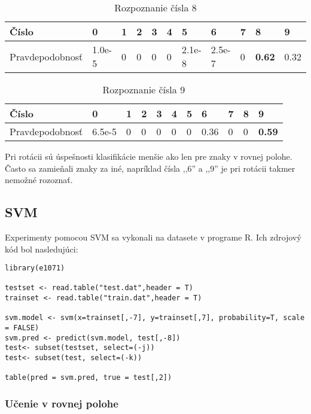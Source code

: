 \begin{table}[H]
  \begin{tabular}{ | l | l | l | l | l | l | l | l | l | l | l |}
    \hline
    Číslo & 0 & 1 & 2 & 3 & 4 & 5 & 6 & 7 & 8 & 9 \\ \hline
    Pravdepodobnosť & 1.0e-5 & 0 & 0 & 0 & 0 & 2.1e-8 & 2.5e-7 & 0 & \textbf{0.62} & 0.32 \\
    \hline
  \end{tabular}
  \caption[Rozpoznanie čísla 8]{Rozpoznanie čísla 8}
\end{table}

\begin{table}[H]
  \begin{tabular}{ | l | l | l | l | l | l | l | l | l | l | l |}
    \hline
    Číslo & 0 & 1 & 2 & 3 & 4 & 5 & 6 & 7 & 8 & 9 \\ \hline
    Pravdepodobnosť & 6.5e-5 & 0 & 0 & 0 & 0 & 0 & 0.36 & 0 & 0 & \textbf{0.59} \\
    \hline
  \end{tabular}
  \caption[Rozpoznanie čísla 9]{Rozpoznanie čísla 9}
\end{table}

Pri rotácii sú úspešnosti klasifikácie menšie ako len pre znaky v rovnej polohe. Často sa zamieňali znaky za iné, napríklad čísla ,,6'' a ,,9'' je pri rotácii takmer nemožné rozoznať.


\newpage
\subsection{SVM} %

Experimenty pomocou SVM sa vykonali na datasete v programe R. Ich zdrojový kód bol nasledujúci:

\begin{verbatim}
library(e1071)
 
testset <- read.table("test.dat",header = T)
trainset <- read.table("train.dat",header = T)
 
svm.model <- svm(x=trainset[,-7], y=trainset[,7], probability=T, scale = FALSE)
svm.pred <- predict(svm.model, test[,-8])
test<- subset(testset, select=(-j))
test<- subset(test, select=(-k))
 
table(pred = svm.pred, true = test[,2])
\end{verbatim}


\subsubsection{Učenie v rovnej polohe} %

